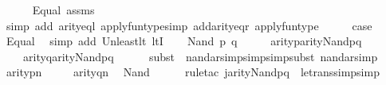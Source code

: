 \begin{isabellebody}
\ \ \ \ \isamarkupfalse%
\ Equal\ assms\ \isamarkupfalse%
\ {\isacharparenleft}{\kern0pt}simp\ add{\isacharcolon}{\kern0pt}\ arity{\isacharunderscore}{\kern0pt}eql\ apply{\isacharunderscore}{\kern0pt}funtype{\isacharcomma}{\kern0pt}simp\ add{\isacharcolon}{\kern0pt}arity{\isacharunderscore}{\kern0pt}eqr\ apply{\isacharunderscore}{\kern0pt}funtype{\isacharparenright}{\kern0pt}\isanewline
\ \ \isamarkupfalse%
\ \isamarkupfalse%
\ {\isacharquery}{\kern0pt}case\ \isamarkupfalse%
\ Equal\ \isamarkupfalse%
\ {\isacharparenleft}{\kern0pt}simp\ add{\isacharcolon}{\kern0pt}\ Un{\isacharunderscore}{\kern0pt}least{\isacharunderscore}{\kern0pt}lt\ ltI{\isacharparenright}{\kern0pt}\isanewline
{}\isamarkupfalse%
\isanewline
\ \ \isamarkupfalse%
\ {\isacharparenleft}{\kern0pt}Nand\ p\ q{\isacharparenright}{\kern0pt}\isanewline
\ \ \isamarkupfalse%
\ \isamarkupfalse%
\ {\isachardoublequoteopen}arity{\isacharparenleft}{\kern0pt}p{\isacharparenright}{\kern0pt}{\isasymle}arity{\isacharparenleft}{\kern0pt}Nand{\isacharparenleft}{\kern0pt}p{\isacharcomma}{\kern0pt}q{\isacharparenright}{\kern0pt}{\isacharparenright}{\kern0pt}{\isachardoublequoteclose}\isanewline
\ \ \ \ {\isachardoublequoteopen}arity{\isacharparenleft}{\kern0pt}q{\isacharparenright}{\kern0pt}{\isasymle}arity{\isacharparenleft}{\kern0pt}Nand{\isacharparenleft}{\kern0pt}p{\isacharcomma}{\kern0pt}q{\isacharparenright}{\kern0pt}{\isacharparenright}{\kern0pt}{\isachardoublequoteclose}\isanewline
\ \ \ \ \isamarkupfalse%
\ {\isacharparenleft}{\kern0pt}subst\ \ nand{\isacharunderscore}{\kern0pt}ar{}{\isacharcomma}{\kern0pt}simp{\isacharcomma}{\kern0pt}simp{\isacharcomma}{\kern0pt}simp{\isacharcomma}{\kern0pt}subst\ nand{\isacharunderscore}{\kern0pt}ar{}{\isacharcomma}{\kern0pt}simp{\isacharplus}{\kern0pt}{\isacharparenright}{\kern0pt}\isanewline
\ \ \isamarkupfalse%
\ \isamarkupfalse%
\ {\isachardoublequoteopen}arity{\isacharparenleft}{\kern0pt}p{\isacharparenright}{\kern0pt}{\isasymle}n{\isachardoublequoteclose}\isanewline
\ \ \ \ \ {\isachardoublequoteopen}arity{\isacharparenleft}{\kern0pt}q{\isacharparenright}{\kern0pt}{\isasymle}n{\isachardoublequoteclose}\ \isamarkupfalse%
\ Nand\isanewline
\ \ \ \ \isamarkupfalse%
\ {\isacharparenleft}{\kern0pt}rule{\isacharunderscore}{\kern0pt}tac\ j{\isacharequal}{\kern0pt}{\isachardoublequoteopen}arity{\isacharparenleft}{\kern0pt}Nand{\isacharparenleft}{\kern0pt}p{\isacharcomma}{\kern0pt}q{\isacharparenright}{\kern0pt}{\isacharparenright}{\kern0pt}{\isachardoublequoteclose}\ \ le{\isacharunderscore}{\kern0pt}trans{\isacharcomma}{\kern0pt}simp{\isacharcomma}{\kern0pt}simp{\isacharparenright}{\kern0pt}{\isacharplus}{\kern0pt}\isanewline

\end{isabellebody}
